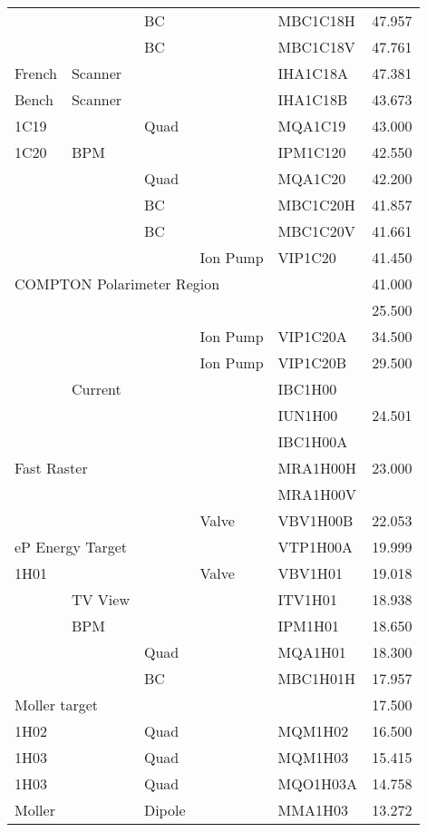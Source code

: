 \begin{longtable}[hpt]{lllllr}
&& BC && MBC1C18H & 47.957 \\
&& BC && MBC1C18V & 47.761 \\ \hline
French & Scanner &&& IHA1C18A & 47.381 \\
Bench & Scanner &&& IHA1C18B & 43.673 \\ \hline
1C19 && Quad && MQA1C19 & 43.000 \\
1C20 & BPM &&& IPM1C120 & 42.550 \\
&& Quad && MQA1C20 & 42.200 \\
&& BC && MBC1C20H & 41.857 \\
&& BC && MBC1C20V & 41.661 \\
&&& Ion Pump & VIP1C20 & 41.450 \\ \hline
\multicolumn{5}{l}{COMPTON Polarimeter Region} & 41.000 \\
& &&&& 25.500 \\
&&& Ion Pump & VIP1C20A & 34.500 \\
&&& Ion Pump & VIP1C20B & 29.500 \\ \hline
& Current &&& IBC1H00 & \\
&&&& IUN1H00 & 24.501 \\
&&&& IBC1H00A & \\
\multicolumn{2}{l}{Fast Raster} &&& MRA1H00H & 23.000 \\ 
&&&& MRA1H00V & \\ 
&&& Valve & VBV1H00B & 22.053 \\
\multicolumn{2}{l}{eP Energy Target} &&& VTP1H00A & 19.999 \\
1H01 &&& Valve & VBV1H01 & 19.018 \\
& TV View &&& ITV1H01 & 18.938 \\
& BPM &&& IPM1H01 & 18.650 \\
&& Quad && MQA1H01 & 18.300 \\
&& BC && MBC1H01H & 17.957 \\
\hline
\multicolumn{2}{l}{Moller target} &&&& 17.500 \\
1H02 && Quad && MQM1H02 & 16.500 \\
1H03 && Quad && MQM1H03 & 15.415 \\
1H03 && Quad && MQO1H03A & 14.758 \\
Moller && Dipole && MMA1H03 & 13.272 \\

\end{longtable}
